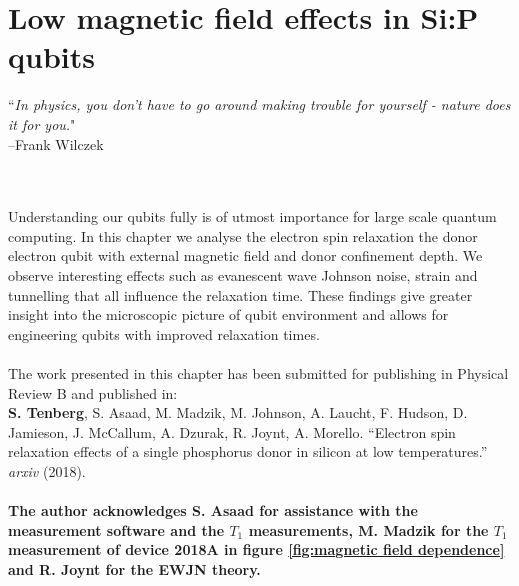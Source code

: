 
\chapter{Low magnetic field effects in Si:P qubits} %

\label{Chapter6} 

\noindent\hrulefill
\vspace{0.5cm} %
\begin{flushright}
        ``\emph{In physics, you don't have to go around making trouble for yourself - nature does it for you.}"
\\ 
--Frank Wilczek \\
\end{flushright}

\vspace{0.5cm}


\noindent\hrulefill
\vspace{0.5cm} %
\\
\hangindent=4cm
\\
Understanding our qubits fully is of utmost importance for large scale quantum computing. In this chapter we analyse the electron spin relaxation the donor electron qubit with external magnetic field and donor confinement depth. We observe interesting effects such as evanescent wave Johnson noise, strain and tunnelling that all influence the relaxation time. These findings give greater insight into the microscopic picture of qubit environment and allows for engineering qubits with improved relaxation times.  
\\ \\
\scriptsize
\hangindent=4cm
The work presented in this chapter has been submitted for publishing in Physical Review B and published in:\\
\textbf{S. Tenberg}, S. Asaad, M. Madzik, M. Johnson, A. Laucht, F. Hudson, D. Jamieson, J. McCallum, A. Dzurak, R. Joynt, A. Morello. ``Electron spin relaxation effects of a single phosphorus donor in silicon at low temperatures.'' \textit{arxiv} (2018).\\
\\
\footnotesize
\hangindent=4cm
\textbf{The author acknowledges S. Asaad for assistance with the measurement software and the $T_1$ measurements,  M. Madzik for the $T_1$ measurement of device 2018A in figure \ref{fig:magnetic field dependence} and R. Joynt for the EWJN theory.}\\

